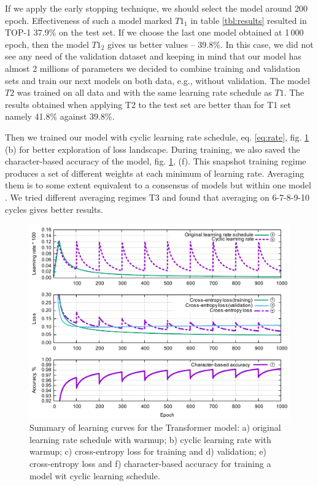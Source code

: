 \documentclass{article}
\begin{document}
If we apply the early stopping technique, we should select the model around 200 epoch. Effectiveness of such a model marked $T1_1$ in table \ref{tbl:results} resulted in TOP-1 37.9\% on the test set. If we choose the last one model obtained at 1\,000 epoch, then the model $T1_2$ gives us better values -- 39.8\%. In this case, we did not see any need of the validation dataset and keeping in mind that our model has almost 2 millions of parameters we decided to combine training and validation sets and train our next models on both data, e.g., without validation. The model $T2$ was trained on all data and with the same learning rate schedule as $T1$. The results obtained when applying T2 to the test set are better than for T1 set namely 41.8\% against 39.8\%.

Then we trained our model with cyclic learning rate schedule, eq. \ref{eq:rate}, fig. \ref{fig:example} (b) for better exploration of loss landscape. During training, we also saved the character-based accuracy of the model, fig. \ref{fig:example}, (f). This snapshot training regime \cite{Snapshot} produces a set of different weights at each minimum of learning rate. Averaging them is to some extent equivalent to a consensus of models but within one model \cite{Izmailov}. We tried different averaging regimes T3 and found that averaging on 6-7-8-9-10 cycles gives better  results. 
\begin{figure}[t!]
  \centering
  \includegraphics[width = 16cm]{images/learning.pdf}
  \caption{Summary of learning curves for the Transformer model: a) original learning rate schedule with warmup; b) cyclic learning rate with warmup; c) cross-entropy loss  for training and d) validation;  e) cross-entropy loss and f) character-based accuracy for training a model wit cyclic learning schedule.}
  \label{fig:example}
\end{figure}
\end{document}
